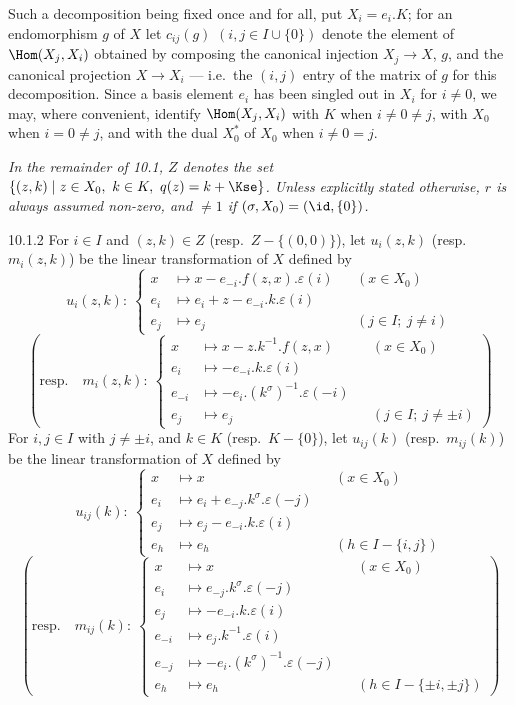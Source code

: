 \documentclass[12pt,a4paper,oneside,english]{smfart}
\makeatletter
\newcommand{\btanchor}[1]{\leavevmode\Hy@raisedlink{\hypertarget{bt:#1}{}}}
\theoremstyle{definition}
\theoremstyle{bt}
\makeatother
\begin{document}
Such a decomposition being fixed once and for all, put $X_i=e_i.K$; for an
endomorphism $g$ of $X$ let $c_{ij}(g)$ $(i,j\in I\cup\{0\})$ denote the element
of $\Hom(X_j,X_i)$ obtained by composing the canonical injection $X_j\to X$,
$g$, and the canonical projection $X\to X_i$ --- i.e.\ the $(i,j)$ entry of the
matrix of $g$ for this decomposition. Since a basis element $e_i$ has been
singled out in $X_i$ for $i\neq0$, we may, where convenient, identify
$\Hom(X_j,X_i)$ with $K$ when $i\neq 0\neq j$, with $X_0$ when $i=0\neq j$, and
with the dual $X_0^{*}$ of $X_0$ when $i\neq0=j$.

\smallskip
\emph{In the remainder of 10.1, $Z$ denotes the set
$\{(z,k)\mid z\in X_0,\ k\in K,\ q(z)=k+\Kse\}$. Unless explicitly stated
otherwise, $r$ is always assumed non-zero, and $\neq1$ if
$(\sigma,X_0)=(\id,\{0\})$.}

\num{10.1.2}\btanchor{10.1.2} For $i\in I$ and $(z,k)\in Z$ (resp.\ $Z-\{(0,0)\}$), let
$u_i(z,k)$ (resp.\ $m_i(z,k)$) be the linear transformation of $X$ defined by
\[
u_i(z,k):\ \left\{
\begin{aligned}
x&\mapsto x-e_{-i}.f(z,x).\varepsilon(i) && (x\in X_0)\\
e_i&\mapsto e_i+z-e_{-i}.k.\varepsilon(i)\\
e_j&\mapsto e_j && (j\in I;\ j\neq i)
\end{aligned}\right.
\]
\[
\left(\text{resp.}\quad
m_i(z,k):\ \left\{
\begin{aligned}
x&\mapsto x-z.k^{-1}.f(z,x) && (x\in X_0)\\
e_i&\mapsto -e_{-i}.k.\varepsilon(i)\\
e_{-i}&\mapsto -e_i.(k^{\sigma})^{-1}.\varepsilon(-i)\\
e_j&\mapsto e_j && (j\in I;\ j\neq\pm i)
\end{aligned}\right.\right)
\]
For $i,j\in I$ with $j\neq\pm i$, and $k\in K$ (resp.\ $K-\{0\}$), let
$u_{ij}(k)$ (resp.\ $m_{ij}(k)$) be the linear transformation of $X$ defined by
\[
u_{ij}(k):\ \left\{
\begin{aligned}
x&\mapsto x && (x\in X_0)\\
e_i&\mapsto e_i+e_{-j}.k^{\sigma}.\varepsilon(-j)\\
e_j&\mapsto e_j-e_{-i}.k.\varepsilon(i)\\
e_h&\mapsto e_h && (h\in I-\{i,j\})
\end{aligned}\right.
\]
\[
\left(\text{resp.}\quad
m_{ij}(k):\ \left\{
\begin{aligned}
x&\mapsto x && (x\in X_0)\\
e_i&\mapsto e_{-j}.k^{\sigma}.\varepsilon(-j)\\
e_j&\mapsto -e_{-i}.k.\varepsilon(i)\\
e_{-i}&\mapsto e_j.k^{-1}.\varepsilon(i)\\
e_{-j}&\mapsto -e_i.(k^{\sigma})^{-1}.\varepsilon(-j)\\
e_h&\mapsto e_h && (h\in I-\{\pm i,\pm j\})
\end{aligned}\right.\right)
\]
\end{document}
